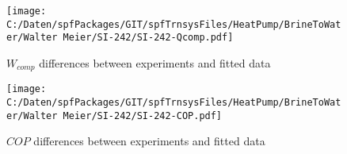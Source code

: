 \documentclass[english]{SPFShortReport}
\begin{document}
\begin{figure}[!ht]
\begin{center}
\texttt{[image: C:/Daten/spfPackages/GIT/spfTrnsysFiles/HeatPump/BrineToWater/Walter Meier/SI-242/SI-242-Qcomp.pdf]}
\caption{$W_{comp}$ differences between experiments and fitted data}
\label{QcompFig}
\end{center}
\end{figure}
\begin{figure}[!ht]
\begin{center}
\texttt{[image: C:/Daten/spfPackages/GIT/spfTrnsysFiles/HeatPump/BrineToWater/Walter Meier/SI-242/SI-242-COP.pdf]}
\caption{$COP$ differences between experiments and fitted data}
\label{COPFig}
\end{center}
\end{figure}
\end{document}
